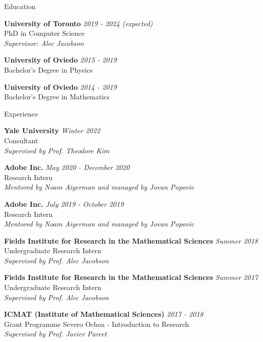 \documentclass{resume}
\newcommand{\cvitembig}[4]{
    {\bf #1} \hfill {\em \small #2} \\ 
    {\small#3 }\\
    {\it \small #4}
}
\newcommand{\cvitem}[3]{
    {\bf #1} \hfill {\em \small #2} \\ 
    {\small#3 }
}
\begin{document}

\begin{rSection}{Education}

\cvitembig{University of Toronto}{2019 - 2024 (expected)}{PhD in Computer Science}{Supervisor: Alec Jacobson}

\cvitem{University of Oviedo}{2015 - 2019}{Bachelor's Degree in Physics}

\cvitem{University of Oviedo}{2014 - 2019}{Bachelor's Degree in Mathematics}

\end{rSection}


\begin{rSection}{Experience}

\cvitembig{Yale University}{Winter 2022}{Consultant}{Supervised by Prof. Theodore Kim}

\cvitembig{Adobe Inc.}{May 2020 - December 2020}{Research Intern}{Mentored by Noam Aigerman and managed by Jovan Popovic}

\cvitembig{Adobe Inc.}{July 2019 - October 2019}{Research Intern}{Mentored by Noam Aigerman and managed by Jovan Popovic}

\cvitembig{Fields Institute for Research in the Mathematical Sciences}{Summer 2018}{Undergraduate Research Intern}{Supervised by Prof. Alec Jacobson}

\cvitembig{Fields Institute for Research in the Mathematical Sciences}{Summer 2017}{Undergraduate Research Intern}{Supervised by Prof. Alec Jacobson}

\cvitembig{ICMAT (Institute of Mathematical Sciences)}{2017 - 2018}{Grant Programme Severo Ochoa - Introduction to Research}{Supervised by Prof. Javier Parcet}

\end{rSection}
\end{document}
